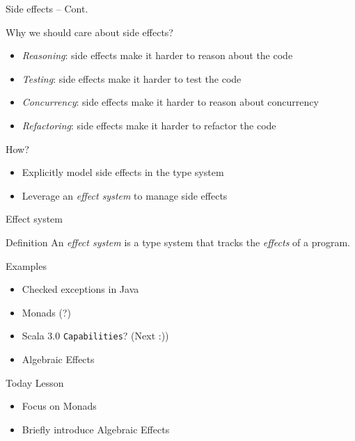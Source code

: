 \documentclass[presentation, 10pt]{beamer}\mode<presentation>{\usetheme{metropolis}}
\begin{document}
\begin{frame}{Side effects -- Cont.}
\begin{exampleblock}{Why we should care about side effects?}
	\begin{itemize}
	\item \emph{Reasoning}: side effects make it harder to reason about the code
	\item \emph{Testing}: side effects make it harder to test the code
	\item \emph{Concurrency}: side effects make it harder to reason about concurrency
	\item \emph{Refactoring}: side effects make it harder to refactor the code
	\end{itemize}
\end{exampleblock}
\begin{alertblock}{How?}
	\begin{itemize}
		\item Explicitly model side effects in the type system
		\item Leverage an \emph{effect system} to manage side effects
	\end{itemize}
\end{alertblock}
\end{frame}

\begin{frame}{Effect system}
\begin{exampleblock}{Definition}
An \emph{effect system} is a type system that tracks the \emph{effects} of a program.
\end{exampleblock}
\begin{exampleblock}{Examples}
	\begin{itemize}
	\item Checked exceptions in Java
	\item Monads (?)
	\item Scala 3.0 \texttt{Capabilities}? (Next :))
	\item Algebraic Effects
	\end{itemize}
\end{exampleblock}
\begin{alertblock}{Today Lesson}
	\begin{itemize}
		\item Focus on Monads 
		\item Briefly introduce Algebraic Effects
	\end{itemize}
\end{alertblock}
\end{frame}
\end{document}

